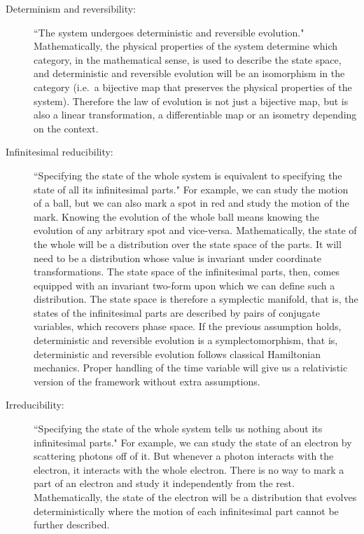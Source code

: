 \documentclass[11pt,letterpaper,fleqn]{memoir} %
\begin{document}
\begin{description}
	\item[Determinism and reversibility:] ``The system undergoes deterministic and reversible evolution." Mathematically, the physical properties of the system determine which category, in the mathematical sense, is used to describe the state space, and deterministic and reversible evolution will be an isomorphism in the category (i.e.~a bijective map that preserves the physical properties of the system). Therefore the law of evolution is not just a bijective map, but is also a linear transformation, a differentiable map or an isometry depending on the context.
	
	\item[Infinitesimal reducibility:] ``Specifying the state of the whole system is equivalent to specifying the state of all its infinitesimal parts." For example, we can study the motion of a ball, but we can also mark a spot in red and study the motion of the mark. Knowing the evolution of the whole ball means knowing the evolution of any arbitrary spot and vice-versa. Mathematically, the state of the whole will be a distribution over the state space of the parts. It will need to be a distribution whose value is invariant under coordinate transformations. The state space of the infinitesimal parts, then, comes equipped with an invariant two-form upon which we can define such a distribution. The state space is therefore a symplectic manifold, that is,
	the states of the infinitesimal parts are described by pairs of conjugate variables, which recovers phase space. If the previous assumption holds, deterministic and reversible evolution is a symplectomorphism, that is,  deterministic and reversible evolution follows classical Hamiltonian mechanics. Proper handling of the time variable will give us a relativistic version of the framework without extra assumptions.
	
	\item[Irreducibility:] ``Specifying the state of the whole system tells us nothing about its infinitesimal parts." For example, we can study the state of an electron by scattering photons off of it. But whenever a photon interacts with the electron, it interacts with the whole electron. There is no way to mark a part of an electron and study it independently from the rest. Mathematically, the state of the electron will be a distribution that evolves deterministically where the motion of each infinitesimal part cannot be further described.
	

\end{description}
\end{document}
